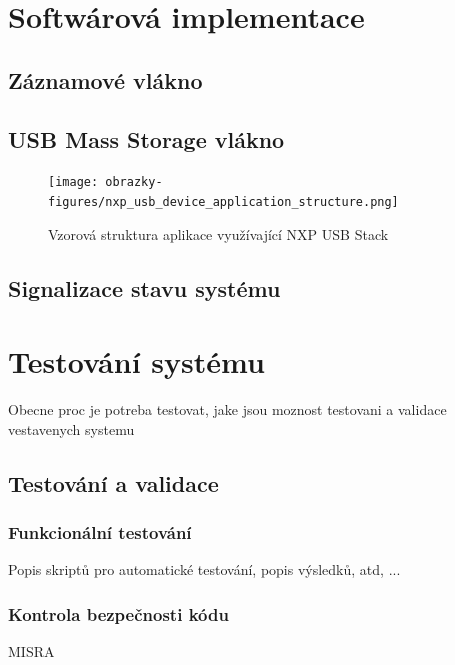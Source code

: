 \chapter{Softwárová implementace}

\section{Záznamové vlákno}

\section{USB Mass Storage vlákno}

\begin{figure}[h]
    \centering
    \texttt{[image: obrazky-figures/nxp\_usb\_device\_application\_structure.png]}
    
    \caption{Vzorová struktura aplikace využívající NXP USB Stack \cite{silicon_labs_mass_storage_protocol}}
    \label{fig:usb-device-app-structure}
\end{figure}


\section{Signalizace stavu systému}

\chapter{Testování systému}
Obecne proc je potreba testovat, jake jsou moznost testovani a validace vestavenych systemu


\section{Testování a validace}

\subsection{Funkcionální testování}
Popis skriptů pro automatické testování, popis výsledků, atd, ...

\subsection{Kontrola bezpečnosti kódu}
MISRA

